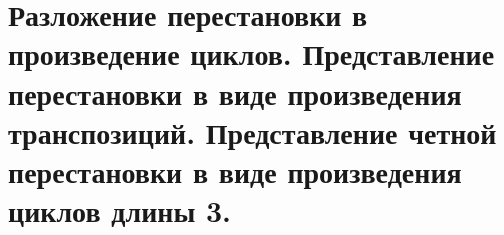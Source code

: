 \section{
    Разложение перестановки в произведение циклов. Представление перестановки в виде произведения транспозиций. Представление четной перестановки в виде произведения циклов длины 3. 
}




